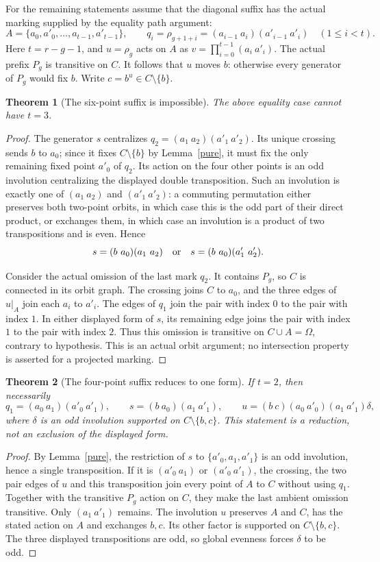 \documentclass[11pt,a4paper]{article}
\newtheorem{theorem}{Theorem}
\begin{document}
For the remaining statements assume that the diagonal suffix
has the actual marking supplied by the equality path argument:
\[
 A=\{a_0,a'_0,\ldots,a_{t-1},a'_{t-1}\},\qquad
 q_i=\rho_{g+1+i}=(a_{i-1}\ a_i)(a'_{i-1}\ a'_i)
 \quad(1\le i<t).
\]
Here $t=r-g-1$, and $u=\rho_g$ acts on $A$ as
$v=\prod_{i=0}^{t-1}(a_i\ a'_i)$.
The actual prefix $P_g$ is transitive on $C$.
It follows that $u$ moves $b$: otherwise every generator
of $P_g$ would fix $b$. Write $c=b^u\in C\setminus\{b\}$.

\begin{theorem}[The six-point suffix is impossible]\label{six}
The above equality case cannot have $t=3$.
\end{theorem}
\begin{proof}
The generator $s$ centralizes
$q_2=(a_1\ a_2)(a'_1\ a'_2)$. Its unique crossing sends
$b$ to $a_0$; since it fixes $C\setminus\{b\}$ by
Lemma~\ref{pure}, it must fix the only remaining fixed point
$a'_0$ of $q_2$. Its action on the four other points is an
odd involution centralizing the displayed double transposition.
Such an involution is exactly one of
$(a_1\ a_2)$ and $(a'_1\ a'_2)$: a commuting permutation
either preserves both two-point orbits, in which case this
is the odd part of their direct product, or exchanges them,
in which case an involution is a product of two transpositions
and is even. Hence
\[
 s=(b\ a_0)(a_1\ a_2)
 \quad\hbox{or}\quad
 s=(b\ a_0)(a'_1\ a'_2).
\]

Consider the actual omission of the last mark $q_2$.
It contains $P_g$, so $C$ is connected in its orbit graph.
The crossing joins $C$ to $a_0$, and the three edges of
$u|_A$ join each $a_i$ to $a'_i$. The edges of $q_1$
join the pair with index $0$ to the pair with index $1$.
In either displayed form of $s$, its remaining edge joins
the pair with index $1$ to the pair with index $2$.
Thus this omission is transitive on $C\cup A=\Omega$,
contrary to hypothesis. This is an actual orbit argument;
no intersection property is asserted for a projected marking.
\end{proof}

\begin{theorem}[The four-point suffix reduces to one form]\label{four}
If $t=2$, then necessarily
\[
 q_1=(a_0\ a_1)(a'_0\ a'_1),\qquad
 s=(b\ a_0)(a_1\ a'_1),\qquad
 u=(b\ c)(a_0\ a'_0)(a_1\ a'_1)\delta,
\]
where $\delta$ is an odd involution supported on
$C\setminus\{b,c\}$. This statement is a reduction, not
an exclusion of the displayed form.
\end{theorem}
\begin{proof}
By Lemma~\ref{pure}, the restriction of $s$ to
$\{a'_0,a_1,a'_1\}$ is an odd involution, hence a single
transposition. If it is $(a'_0\ a_1)$ or $(a'_0\ a'_1)$,
the crossing, the two pair edges of $u$ and this transposition
join every point of $A$ to $C$ without using $q_1$.
Together with the transitive $P_g$ action on $C$, they make
the last ambient omission transitive. Only
$(a_1\ a'_1)$ remains. The involution $u$ preserves $A$
and $C$, has the stated action on $A$ and exchanges $b,c$.
Its other factor is supported on $C\setminus\{b,c\}$.
The three displayed transpositions are odd, so global evenness
forces $\delta$ to be odd.
\end{proof}
\end{document}
